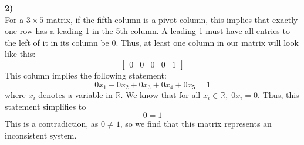 \documentclass{article}
\newcommand{\R}{\mathbb{R}} %
\begin{document}
\noindent\textbf{2)}\vspace{3mm}\\
 For a $3\times5$ matrix, if the fifth column is a pivot column, this implies that exactly one row has a leading 1 in the 5th column. A leading 1 must have all entries to the left of it in its column be 0. Thus, at least one column in our matrix will look like this:
 $$\begin{bmatrix}0&0&0&0&1\end{bmatrix}$$
 This column implies the following statement:
 $$0x_1+0x_2+0x_3+0x_4+0x_5=1$$
 where $x_i$ denotes a variable in $\R$. We know that for all $x_i\in\R,\;0x_i=0$. Thus, this statement simplifies to
 $$0=1$$
 This is a contradiction, as $0\neq1$, so we find that this matrix represents an inconsistent system.\vspace{3mm}\\
\end{document}
